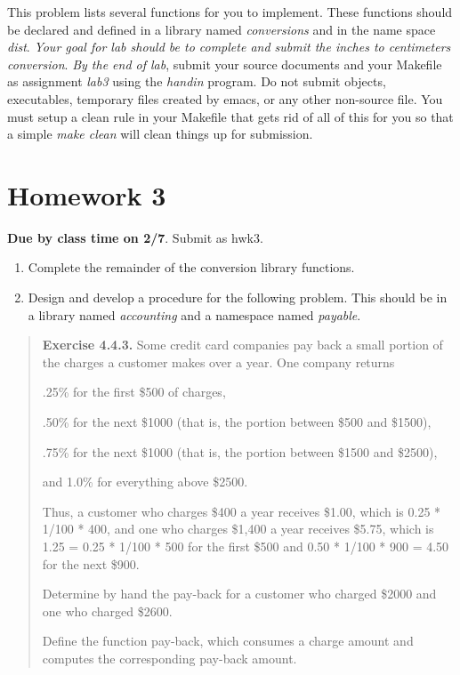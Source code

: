 \documentclass[]{tufte-handout}
\begin{document}
This problem lists several functions for you to implement. These functions should be declared and defined in a library named \textit{conversions} and in the name space \textit{dist}. \textit{Your goal for lab should be to complete and submit the inches to centimeters conversion}.  \textit{By the end of lab}, submit your source documents and your Makefile as assignment \textit{lab3} using the  \textit{handin} program.  Do not submit objects, executables, temporary files created by emacs, or any other non-source file. You must setup a clean rule in your Makefile that gets rid of all of this for you so that a simple \textit{make clean} will clean things up for submission.

\newpage

\section{Homework 3}

\begin{center}
\textbf{Due by class time on 2/7}. Submit as hwk3.
\end{center}

\begin{enumerate}
\item Complete the remainder of the conversion library functions.
\item Design and develop a procedure for the following problem. This should be in a library named \textit{accounting} and a namespace named \textit{payable}.
\end{enumerate}

\begin{framed}
\begin{quote}
\textbf{Exercise 4.4.3.}   Some credit card companies pay back a small portion of the charges a customer makes over a year. One company returns

.25\% for the first \$500 of charges,

.50\% for the next \$1000 (that is, the portion between \$500 and \$1500),

.75\% for the next \$1000 (that is, the portion between \$1500 and \$2500),

and 1.0\% for everything above \$2500.

Thus, a customer who charges \$400 a year receives \$1.00, which is 0.25 * 1/100 * 400, and one who charges \$1,400 a year receives \$5.75, which is 1.25 = 0.25 * 1/100 * 500 for the first \$500 and 0.50 * 1/100 * 900 = 4.50 for the next \$900.

Determine by hand the pay-back for a customer who charged \$2000 and one who charged \$2600.

Define the function pay-back, which consumes a charge amount and computes the corresponding pay-back amount.
\end{quote}
\end{framed}
\end{document}
